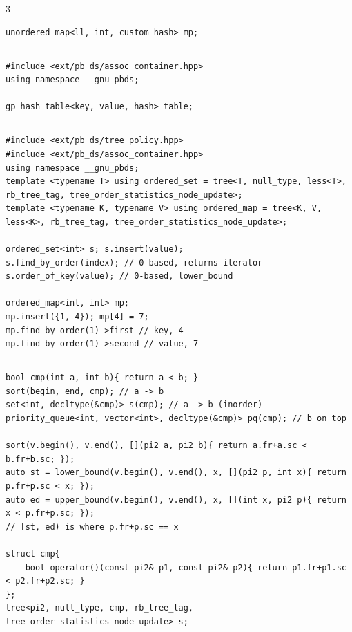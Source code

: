 \documentclass[landscape, 8pt, a4paper, oneside]{extarticle}
\begin{document}
\begin{multicols*}{3}
\begin{verbatim}
unordered_map<ll, int, custom_hash> mp;
\end{verbatim}
\subsection{}
\begin{verbatim}
#include <ext/pb_ds/assoc_container.hpp>
using namespace __gnu_pbds;

gp_hash_table<key, value, hash> table;
\end{verbatim}
\subsection{}
\begin{verbatim}
#include <ext/pb_ds/tree_policy.hpp>
#include <ext/pb_ds/assoc_container.hpp>
using namespace __gnu_pbds;
template <typename T> using ordered_set = tree<T, null_type, less<T>, rb_tree_tag, tree_order_statistics_node_update>;
template <typename K, typename V> using ordered_map = tree<K, V, less<K>, rb_tree_tag, tree_order_statistics_node_update>;

ordered_set<int> s; s.insert(value);
s.find_by_order(index); // 0-based, returns iterator
s.order_of_key(value); // 0-based, lower_bound

ordered_map<int, int> mp;
mp.insert({1, 4}); mp[4] = 7;
mp.find_by_order(1)->first // key, 4
mp.find_by_order(1)->second // value, 7
\end{verbatim}
\subsection{}
\begin{verbatim}
bool cmp(int a, int b){ return a < b; }
sort(begin, end, cmp); // a -> b
set<int, decltype(&cmp)> s(cmp); // a -> b (inorder)
priority_queue<int, vector<int>, decltype(&cmp)> pq(cmp); // b on top

sort(v.begin(), v.end(), [](pi2 a, pi2 b){ return a.fr+a.sc < b.fr+b.sc; });
auto st = lower_bound(v.begin(), v.end(), x, [](pi2 p, int x){ return p.fr+p.sc < x; });
auto ed = upper_bound(v.begin(), v.end(), x, [](int x, pi2 p){ return x < p.fr+p.sc; });
// [st, ed) is where p.fr+p.sc == x

struct cmp{
	bool operator()(const pi2& p1, const pi2& p2){ return p1.fr+p1.sc < p2.fr+p2.sc; }
};
tree<pi2, null_type, cmp, rb_tree_tag, tree_order_statistics_node_update> s;
\end{verbatim}

\end{multicols*}
\end{document}
